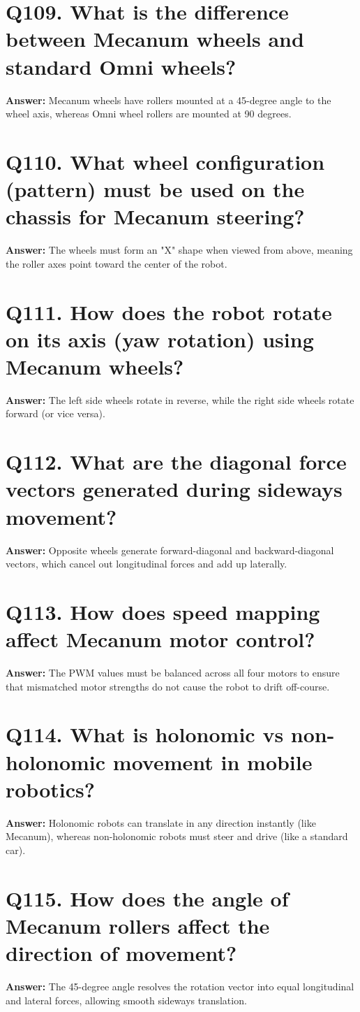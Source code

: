 \documentclass[12pt,a4paper,oneside]{report}
\begin{document}
\section{Q109. What is the difference between Mecanum wheels and standard Omni wheels?}
\textbf{Answer:} Mecanum wheels have rollers mounted at a 45-degree angle to the wheel axis, whereas Omni wheel rollers are mounted at 90 degrees.

\section{Q110. What wheel configuration (pattern) must be used on the chassis for Mecanum steering?}
\textbf{Answer:} The wheels must form an "X" shape when viewed from above, meaning the roller axes point toward the center of the robot.

\section{Q111. How does the robot rotate on its axis (yaw rotation) using Mecanum wheels?}
\textbf{Answer:} The left side wheels rotate in reverse, while the right side wheels rotate forward (or vice versa).

\section{Q112. What are the diagonal force vectors generated during sideways movement?}
\textbf{Answer:} Opposite wheels generate forward-diagonal and backward-diagonal vectors, which cancel out longitudinal forces and add up laterally.

\section{Q113. How does speed mapping affect Mecanum motor control?}
\textbf{Answer:} The PWM values must be balanced across all four motors to ensure that mismatched motor strengths do not cause the robot to drift off-course.

\section{Q114. What is holonomic vs non-holonomic movement in mobile robotics?}
\textbf{Answer:} Holonomic robots can translate in any direction instantly (like Mecanum), whereas non-holonomic robots must steer and drive (like a standard car).

\section{Q115. How does the angle of Mecanum rollers affect the direction of movement?}
\textbf{Answer:} The 45-degree angle resolves the rotation vector into equal longitudinal and lateral forces, allowing smooth sideways translation.
\end{document}
